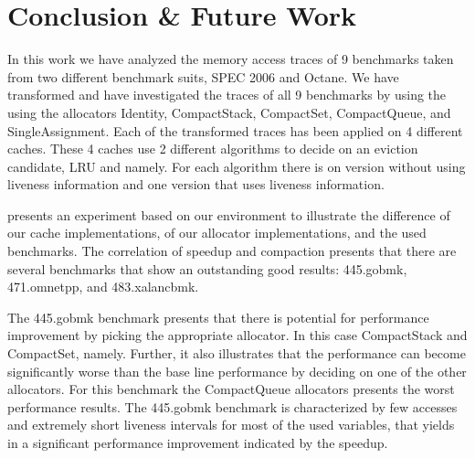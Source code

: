 \documentclass[onecolumn, openright, master, english, signatures]{dbrgrptt}
\begin{document}


\chapter{Conclusion \& Future Work}\label{cha:conclusion}

In this work we have analyzed the memory access traces of 9 benchmarks taken from two different benchmark suits, SPEC 2006 and Octane. We have transformed and have investigated the traces of all 9 benchmarks by using the using the allocators Identity, CompactStack, CompactSet, CompactQueue, and SingleAssignment. Each of the transformed traces has been applied on 4 different caches. These 4 caches use 2 different algorithms to decide on an eviction candidate, \ac{LRU} and \citeauthor{belady1966study} namely. For each algorithm there is on version without using liveness information and one version that uses liveness information.

 presents an experiment based on our environment to illustrate the difference of our cache implementations, of our allocator implementations, and the used benchmarks.
The correlation of speedup and compaction presents that there are several benchmarks that show an outstanding good results: 445.gobmk, 471.omnetpp, and 483.xalancbmk.

The 445.gobmk benchmark presents that there is potential for performance improvement by picking the appropriate allocator. In this case CompactStack and CompactSet, namely. Further, it also illustrates that the performance can become significantly worse than the base line performance by deciding on one of the other allocators. For this benchmark the CompactQueue allocators presents the worst performance results. The 445.gobmk benchmark is characterized by few accesses and extremely short liveness intervals for most of the used variables, that yields in a significant performance improvement indicated by the speedup.
\end{document}
